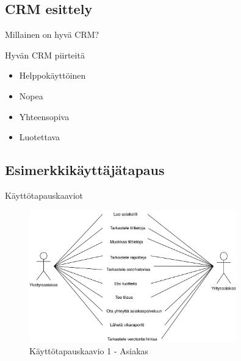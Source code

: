\documentclass{beamer}
\begin{document}
\subsection{CRM esittely}

\begin{frame}{Millainen on hyvä CRM?}

Hyvän CRM piirteitä

	\begin{itemize}
		\item<2-> Helppokäyttöinen
		\item<3-> Nopea
		\item<4-> Yhteensopiva
		\item<5-> Luotettava
	\end{itemize}
\end{frame}

\subsection{Esimerkki\-käyttäjä\-tapaus}

\begin{frame}{Käyttötapauskaaviot}

	\begin{figure}[h]
		\includegraphics[width=0.8\textwidth]{../harjoitustyo/images/kayttotapauskaavio1.pdf}
		\caption{Käyttötapauskaavio 1 - Asiakas}
	\end{figure}

\end{frame}
\end{document}
